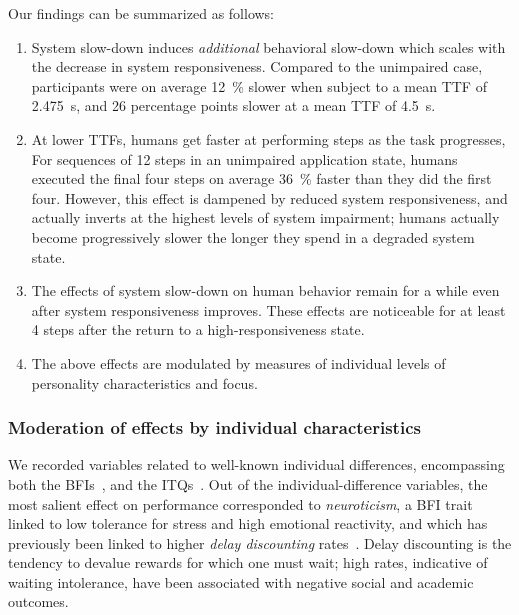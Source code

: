 
Our findings can be summarized as follows:
\begin{enumerate}
    \item System slow-down induces \emph{additional} behavioral slow-down which scales with the decrease in system responsiveness.
    Compared to the unimpaired case, participants were on average \SI{12}{\percent} slower when subject to a mean \gls{TTF} of \SI{2.475}{\second}, and \num{26} percentage points slower at a mean \gls{TTF} of \SI{4.5}{\second}.

    \item\label{item:speedup} At lower \glspl{TTF}, humans get faster at performing steps as the task progresses,
    For sequences of \num{12} steps in an unimpaired application state, humans executed the final four steps on average \SI{36}{\percent} faster than they did the first four.
    However, this effect is dampened by reduced system responsiveness, and actually inverts at the highest levels of system impairment;
    humans actually become progressively slower the longer they spend in a degraded system state.

    \item\label{item:remain} The effects of system slow-down on human behavior remain for a while even after system responsiveness improves.
    These effects are noticeable for at least \num{4} steps after the return to a high-responsiveness state. 
    
    \item The above effects are modulated by measures of individual levels of personality characteristics and focus.
\end{enumerate}

\subsubsection{Moderation of effects by individual characteristics}\label{ssec:moderationeffects}

We recorded variables related to well-known individual differences, encompassing both the \glspl{BFI}~\cite{john1999big}, and the \glspl{ITQ}~\cite{witmer1998measuring}.
Out of the individual-difference variables, the most salient effect on performance corresponded to \emph{neuroticism}, a \gls{BFI} trait linked to low tolerance for stress and high emotional reactivity, and which has previously been linked to higher \emph{delay discounting} rates~\cite{hirsh2008delay}.
Delay discounting is the tendency to devalue rewards for which one must wait; high rates, indicative of waiting intolerance, have been associated with negative social and academic outcomes.

